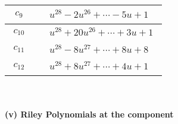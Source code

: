 \documentclass[1p]{elsarticle_modified}
\theoremstyle{definition}
\begin{document}
\begin{tabular}{m{50pt}|m{274pt}}
\hline $$\begin{aligned}c_{9}\end{aligned}$$&$\begin{aligned}
&u^{28}-2 u^{26}+\cdots-5 u+1
\end{aligned}$\\
\hline $$\begin{aligned}c_{10}\end{aligned}$$&$\begin{aligned}
&u^{28}+20 u^{26}+\cdots+3 u+1
\end{aligned}$\\
\hline $$\begin{aligned}c_{11}\end{aligned}$$&$\begin{aligned}
&u^{28}-8 u^{27}+\cdots+8 u+8
\end{aligned}$\\
\hline $$\begin{aligned}c_{12}\end{aligned}$$&$\begin{aligned}
&u^{28}+8 u^{27}+\cdots+4 u+1
\end{aligned}$\\
\hline
\end{tabular}\\~\\
\newpage\renewcommand{\arraystretch}{1}
\flushleft \textbf{(v) Riley Polynomials at the component}\newline \\
\end{document}
